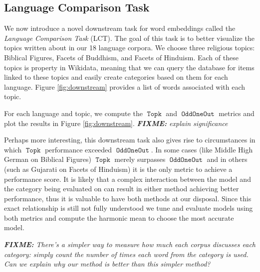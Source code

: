 \documentclass[11pt,a4paper]{article}
\DeclareMathOperator{\OddOneOut}{\texttt{OddOneOut}}
\DeclareMathOperator{\topk}{\texttt{Topk}}
\newcommand{\fixme}[1]{{\color{red}\itshape \textbf{FIXME:} {#1}}}
\begin{document}
\subsection{Language Comparison Task}

We now introduce a novel downstream task for word embeddings called the \emph{Language Comparison Task} (LCT).
The goal of this task is to better visualize the topics written about in our 18 language corpora.
We choose three religious topics: Biblical Figures, Facets of Buddhism, and Facets of Hinduism.
Each of these topics is property in Wikidata, 
meaning that we can query the database for items linked to these topics
and easily create categories based on them for each language.
Figure \ref{fig:downstream} provides a list of words associated with each topic.

For each language and topic, we compute the $\topk$ and $\OddOneOut$ metrics and plot the results in Figure \ref{fig:downstream}.
\fixme{explain significance}


Perhaps more interesting, this downstream task also gives rise to circumstances in which $\topk$ performance exceeded $\OddOneOut$. 
In some cases (like Middle High German on Biblical Figures) $\topk$ merely surpasses $\OddOneOut$ 
and in others (such as Gujarati on Facets of Hinduism) it is the only metric to achieve a performance score. 
It is likely that a complex interaction between the model and the category being evaluated on can result in either method achieving better performance, 
thus it is valuable to have both methods at our disposal. 
Since this exact relationship is still not fully understood we tune and evaluate models using both metrics 
and compute the harmonic mean to choose the most accurate model.

\fixme{
    There's a simpler way to measure how much each corpus discusses each category:
    simply count the number of times each word from the category is used.
    Can we explain why our method is better than this simpler method?
}


\end{document}
